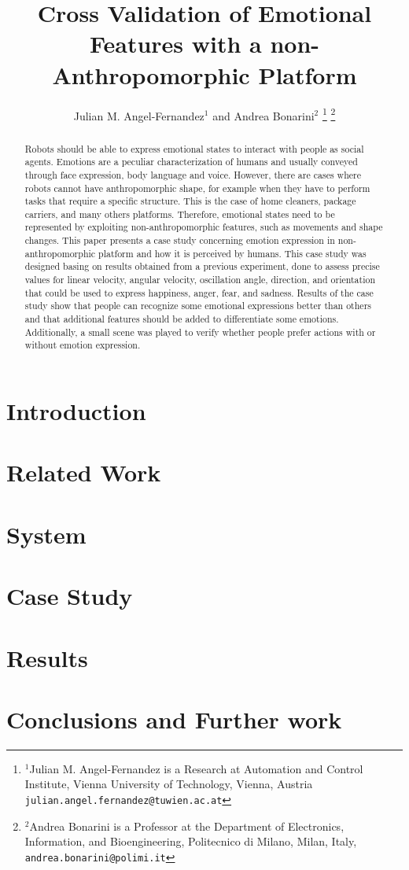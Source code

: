 \documentclass[letterpaper, 10 pt, conference]{ieeeconf}  %
\title{\LARGE \bf
Cross Validation of Emotional Features with a non-Anthropomorphic Platform
}
\author{Julian M. Angel-Fernandez$^{1}$ and Andrea Bonarini$^{2}$%
\thanks{$^{1}$Julian M. Angel-Fernandez is a Research at Automation and Control Institute, Vienna University of Technology, Vienna, Austria
        {\tt\small julian.angel.fernandez@tuwien.ac.at}}%
\thanks{$^{2}$Andrea Bonarini is a Professor at the Department of Electronics, Information, and Bioengineering, Politecnico di Milano, Milan, Italy,
        {\tt\small andrea.bonarini@polimi.it}}%
}
\begin{document}
\maketitle
\thispagestyle{empty}
\pagestyle{empty}


\begin{abstract}
Robots should be able to express emotional states to interact with people as social agents. Emotions are a peculiar characterization of humans and usually conveyed through face expression, body language and voice. However, there are cases where robots cannot have anthropomorphic shape, for example when they have to perform tasks that require a specific structure. This is the case of home cleaners, package carriers, and many others platforms. Therefore, emotional states need to be represented by exploiting non-anthropomorphic features, such as movements and shape changes. This paper presents a case study concerning emotion expression in non-anthropomorphic platform and how it is perceived by humans. This case study was designed basing on results obtained from a previous experiment, done to assess precise values for linear velocity, angular velocity, oscillation angle, direction, and orientation that could be used to express happiness, anger, fear, and sadness. Results of the case study  show that people can recognize some emotional expressions better than others and that additional features should be added to differentiate some emotions. Additionally, a small scene was played to verify whether people prefer actions with or without emotion expression. 
\end{abstract}

\section{Introduction}

\section{Related Work}
\label{sec:related_work}

\section{System}
\label{sec:system}

\section{Case Study}
\label{sec:case}

\section{Results}
\label{sec:results}

\section{Conclusions and Further work}




\addtolength{\textheight}{-12cm}
\end{document}
